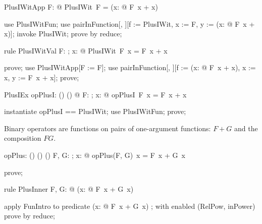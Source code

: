 \documentclass{article}
\begin{document}
\begin{theorem}{PlusIWitApp}
  \forall F: \nat \fun \nat @ PlusIWit~F = (\lambda x: \nat @ F~x + x)
\end{theorem}

\begin{zproof}
use PlusIWitFun;
use pairInFunction[\nat \fun \nat, \nat \fun \nat][f := PlusIWit, x := F, y := (\lambda x: \nat @ F~x + x)];
invoke PlusIWit;
prove by reduce;
\end{zproof}

\begin{theorem}{rule PlusIWitVal}
  \forall F: \nat \fun \nat; x: \nat @ PlusIWit~F~x = F~x + x
\end{theorem}

\begin{zproof}
prove;
use PlusIWitApp[F := F];
use pairInFunction[\nat, \nat][f := (\lambda x: \nat @ F~x + x), x := x, y := F~x + x];
prove;
\end{zproof}

\begin{theorem}{PlusIEx}
  \exists opPlusI: (\nat \fun \nat) \fun (\nat \fun \nat) @ \forall F: \nat \fun \nat; x: \nat @ opPlusI~F~x = F~x + x
\end{theorem}

\begin{zproof}
instantiate opPlusI == PlusIWit;
use PlusIWitFun;
prove;
\end{zproof}

Binary operators are functions on pairs of one-argument functions: $F + G$ and the composition $FG$.

\begin{axdef}
  opPlus: (\nat \fun \nat) \cross (\nat \fun \nat) \fun (\nat \fun \nat)
\where
   \forall F, G: \nat \fun \nat; x: \nat @ opPlus(F, G)~x = F~x + G~x
\end{axdef}

\begin{zproof}
prove;
\end{zproof}

\begin{theorem}{rule PlusInner}
  \forall F, G: \nat \fun \nat @ (\lambda x: \nat @ F~x + G~x) \in \nat \fun \nat
\end{theorem}

\begin{zproof}
apply FunIntro to predicate (\lambda x: \nat @ F~x + G~x) \in \nat \fun \nat;
with enabled (RelPow, inPower) prove by reduce;
\end{zproof}
\end{document}
